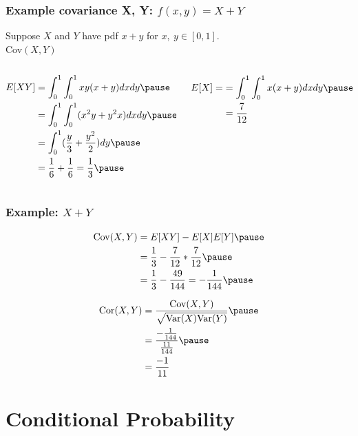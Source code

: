 \documentclass[aspectratio=169, handout]{beamer}
\numberwithin{equation}{section}
\begin{document}
\begin{frame}
\frametitle{Example covariance X, Y: $f(x,y)=X + Y$} 
Suppose $X$ and $Y$ have pdf $x + y$ for $x,\ y \in [0,1]$.  \pause \\
Cov$(X,Y)$  \pause 
\begin{columns}
\begin{column}{0.5\textwidth}
\begin{align*}
E[XY] &= \int_{0}^{1} \int_{0}^{1} xy (x + y) dx dy \pause \\
&= \int_{0}^{1} \int_{0}^{1} (x^2 y + y^2 x) dx dy   \pause \\
&= \int_{0}^{1} (\frac{y}{3} + \frac{y^2}{2} ) dy  \pause \\
&= \frac{1}{6} + \frac{1}{6} = \frac{1}{3} \pause  
\end{align*}
\end{column}
\begin{column}{0.5\textwidth}
\begin{align*}
E[X]= &= \int_{0}^{1} \int_{0}^{1} x (x + y) dxdy  \pause \\
 &= \frac{7}{12} 
 \end{align*}
 \end{column}
\end{columns}

\end{frame}




\begin{frame}
\frametitle{Example: $X + Y$ } 

\begin{align*}
\text{Cov}(X,Y) &=  E[XY] - E[X]E[Y]   \pause \\
&= \frac{1}{3}  - \frac{7}{12} *\frac{7}{12}   \pause \\
&= \frac{1}{3}  - \frac{49}{144} = -\frac{1}{144}   \pause 
\end{align*}

\begin{align*}
\text{Cor}(X,Y) &= \frac{\text{Cov}(X,Y)}{\sqrt{\text{Var}(X) \text{Var}(Y) }} \pause \\
&= \frac{- \frac{1}{144}}{\frac{11}{144}}  \pause  \\
&= \frac{-1}{11}  
\end{align*}


\end{frame}


\section{Conditional Probability}
\end{document}
